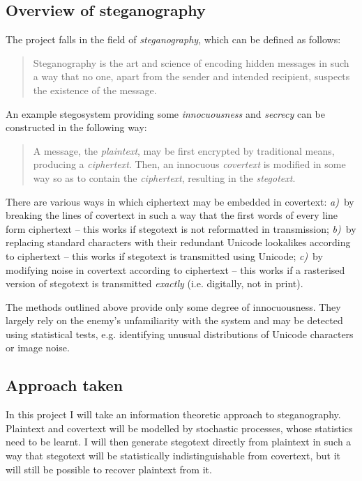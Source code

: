 \documentclass[draft]{IIBproject}
\makeatletter
\DeclareRobustCommand*{\eg}{e.g.\@\xspace}
\DeclareRobustCommand*{\ie}{i.e.\@\xspace}
\makeatother
\begin{document}
\subsection{Overview of steganography}

The project falls in the field of \emph{steganography}, which can be defined as follows:

\begin{quote} Steganography is the art and science of encoding hidden messages in such a way that no one, apart from the sender and intended recipient, suspects the existence of the message. \cite{wiki:steganography} \end{quote}

An example stegosystem providing some \emph{innocuousness} and \emph{secrecy} can be constructed in the following way:

\begin{quote} A message, the \emph{plaintext}, may be first encrypted by traditional means, producing a \emph{ciphertext}. Then, an innocuous \emph{covertext} is modified in some way so as to contain the \emph{ciphertext}, resulting in the \emph{stegotext}. \cite{wiki:steganography} \end{quote}

There are various ways in which ciphertext may be embedded in covertext:
\emph{a)}~by breaking the lines of covertext in such a way that the first words of every line form ciphertext -- this works if stegotext is not reformatted in transmission;
\emph{b)}~by replacing standard characters with their redundant Unicode lookalikes according to ciphertext  -- this works if stegotext is transmitted using Unicode;
\emph{c)}~by modifying noise in covertext according to ciphertext -- this works if a rasterised version of stegotext is transmitted \emph{exactly} (\ie digitally, not in print).

The methods outlined above provide only some degree of innocuousness. They largely rely on the enemy's unfamiliarity with the system and may be detected using statistical tests, \eg identifying unusual distributions of Unicode characters or image noise.

\subsection{Approach taken}

In this project I will take an information theoretic approach to steganography. Plaintext and covertext will be modelled by stochastic processes, whose statistics need to be learnt. I will then generate stegotext directly from plaintext in such a way that stegotext will be statistically indistinguishable from covertext, but it will still be possible to recover plaintext from it.
\end{document}
